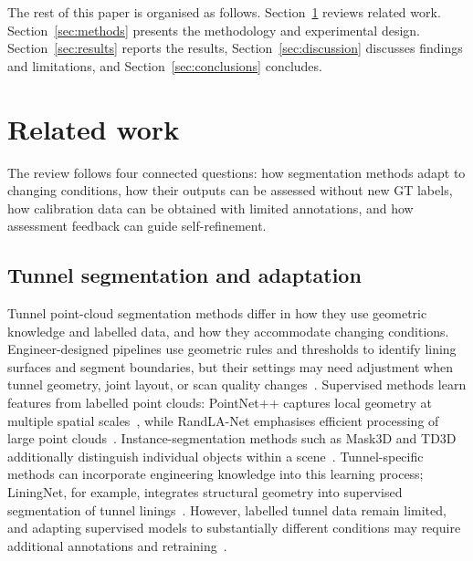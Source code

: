 \documentclass[a4paper,fleqn]{cas-dc}
\begin{document}
{The rest of this paper is organised as follows. Section~\ref{sec:related} reviews related work. Section~\ref{sec:methods} presents the methodology and experimental design. Section~\ref{sec:results} reports the results, Section~\ref{sec:discussion} discusses findings and limitations, and Section~\ref{sec:conclusions} concludes.


\section{Related work}
\label{sec:related}

The review follows four connected questions: how segmentation methods adapt to changing conditions, how their outputs can be assessed without new GT labels, how calibration data can be obtained with limited annotations, and how assessment feedback can guide self-refinement.

\subsection{Tunnel segmentation and adaptation}

Tunnel point-cloud segmentation methods differ in how they use geometric knowledge and labelled data, and how they accommodate changing conditions. Engineer-designed pipelines use geometric rules and thresholds to identify lining surfaces and segment boundaries, but their settings may need adjustment when tunnel geometry, joint layout, or scan quality changes~\cite{huang2021bim,weidner2024generalized,wang2025automated}. Supervised methods learn features from labelled point clouds: PointNet++ captures local geometry at multiple spatial scales~\cite{qi2017pointnet}, while RandLA-Net emphasises efficient processing of large point clouds~\cite{hu2020randla}. Instance-segmentation methods such as Mask3D and TD3D additionally distinguish individual objects within a scene~\cite{schult2023mask3d,kolodiazhnyi2024td3d}. Tunnel-specific methods can incorporate engineering knowledge into this learning process; LiningNet, for example, integrates structural geometry into supervised segmentation of tunnel linings~\cite{lin2025liningnet}. However, labelled tunnel data remain limited, and adapting supervised models to substantially different conditions may require additional annotations and retraining~\cite{su2024review, cha2024deep}.

}
\end{document}
